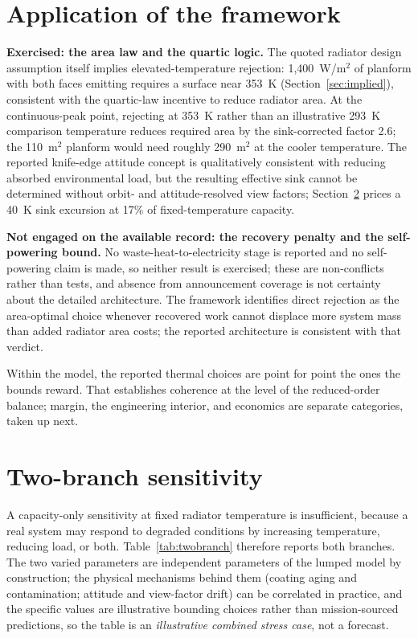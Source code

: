 \documentclass[11pt]{article}
\begin{document}
\section{Application of the framework}\label{sec:application}

\textbf{Exercised: the area law and the quartic logic.} The quoted radiator design assumption itself implies elevated-temperature rejection: 1{,}400~W/m$^{2}$ of planform with both faces emitting requires a surface near 353~K (Section~\ref{sec:implied}), consistent with the quartic-law incentive to reduce radiator area. At the continuous-peak point, rejecting at 353~K rather than an illustrative 293~K comparison temperature reduces required area by the sink-corrected factor 2.6; the 110~m$^{2}$ planform would need roughly 290~m$^{2}$ at the cooler temperature. The reported knife-edge attitude concept is qualitatively consistent with reducing absorbed environmental load, but the resulting effective sink cannot be determined without orbit- and attitude-resolved view factors; Section~\ref{sec:margins} prices a 40~K sink excursion at 17\% of fixed-temperature capacity.

\textbf{Not engaged on the available record: the recovery penalty and the self-powering bound.} No waste-heat-to-electricity stage is reported and no self-powering claim is made, so neither result is exercised; these are non-conflicts rather than tests, and absence from announcement coverage is not certainty about the detailed architecture. The framework identifies direct rejection as the area-optimal choice whenever recovered work cannot displace more system mass than added radiator area costs; the reported architecture is consistent with that verdict.

Within the model, the reported thermal choices are point for point the ones the bounds reward. That establishes coherence at the level of the reduced-order balance; margin, the engineering interior, and economics are separate categories, taken up next.

\section{Two-branch sensitivity}\label{sec:margins}

A capacity-only sensitivity at fixed radiator temperature is insufficient, because a real system may respond to degraded conditions by increasing temperature, reducing load, or both. Table~\ref{tab:twobranch} therefore reports both branches. The two varied parameters are independent parameters of the lumped model by construction; the physical mechanisms behind them (coating aging and contamination; attitude and view-factor drift) can be correlated in practice, and the specific values are illustrative bounding choices rather than mission-sourced predictions, so the table is an \emph{illustrative combined stress case}, not a forecast.
\end{document}
